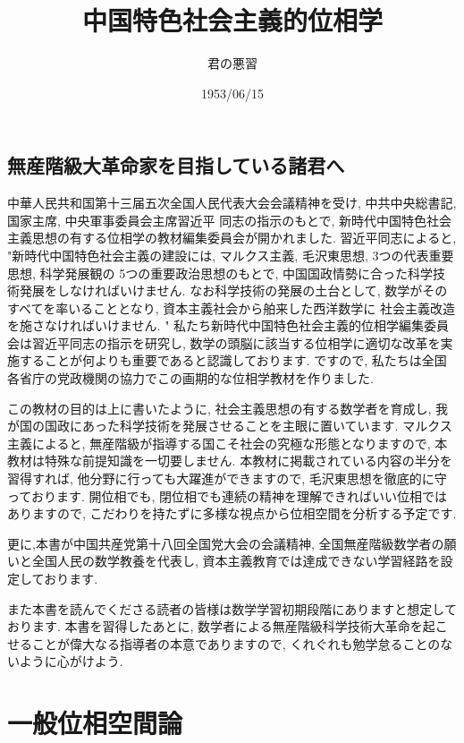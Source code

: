 \documentclass[dvipdfmx]{jbook}
\theoremstyle{remark}
\theoremstyle{plain}
\begin{document}
\title{中国特色社会主義的位相学}
\author{君の悪習}
\date{1953/06/15}
\maketitle
\chapter*{無産階級大革命家を目指している諸君へ}
中華人民共和国第十三届五次全国人民代表大会会議精神を受け, 中共中央総書記, 国家主席, 中央軍事委員会主席習近平
同志の指示のもとで, 新時代中国特色社会主義思想の有する位相学の教材編集委員会が開かれました.
習近平同志によると, "新時代中国特色社会主義の建設には, マルクス主義, 毛沢東思想, 3つの代表重要思想, 科学発展観の
5つの重要政治思想のもとで, 
中国国政情勢に合った科学技術発展をしなければいけません. 
なお科学技術の発展の土台として, 数学がそのすべてを率いることとなり, 資本主義社会から舶来した西洋数学に
社会主義改造を施さなければいけません. " 
私たち新時代中国特色社会主義的位相学編集委員会は習近平同志の指示を研究し, 数学の頭脳に該当する位相学に適切な改革を実施することが何よりも重要であると認識しております. ですので, 私たちは全国各省庁の党政機関の協力でこの画期的な位相学教材を作りました. 

この教材の目的は上に書いたように, 社会主義思想の有する数学者を育成し, 
我が国の国政にあった科学技術を発展させることを主眼に置いています. 
マルクス主義によると, 無産階級が指導する国こそ社会の究極な形態となりますので, 本教材は特殊な前提知識を一切要しません.
本教材に掲載されている内容の半分を習得すれば, 他分野に行っても大躍進ができますので, 毛沢東思想を徹底的に守っております.
開位相でも, 閉位相でも連続の精神を理解できればいい位相ではありますので, 
こだわりを持たずに多様な視点から位相空間を分析する予定です.

更に,本書が中国共産党第十八回全国党大会の会議精神, 
全国無産階級数学者の願いと全国人民の数学教養を代表し, 資本主義教育では達成できない学習経路を設定しております. 

また本書を読んでくださる読者の皆様は数学学習初期段階にありますと想定しております. 
本書を習得したあとに, 数学者による無産階級科学技術大革命を起こせることが偉大なる指導者の本意でありますので, 
くれぐれも勉学怠ることのないように心がけよう. 
\newpage

\tableofcontents
{}



\part{一般位相空間論}
\end{document}
